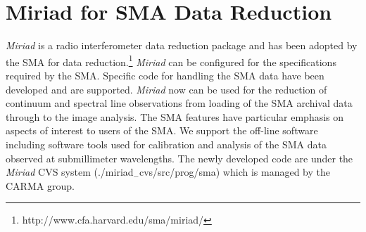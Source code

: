 \section{Miriad for SMA Data Reduction}
{\it {}Miriad} is a radio interferometer data reduction package \citep{stw95} and has been adopted by the SMA for data reduction.\footnote{http://www.cfa.harvard.edu/sma/miriad/} {\it {}Miriad} can be configured for the specifications required by the SMA. Specific code for handling the SMA data have been developed and are supported. {\it Miriad} now can be used for the reduction of continuum and spectral line observations from loading of the SMA archival data  through to the image analysis. The SMA features have particular emphasis on aspects of interest to users of the SMA. We support the off-line software including software tools used for calibration and analysis of the SMA data observed at submillimeter wavelengths. The newly developed code are under the {\it {}Miriad} CVS system (./miriad$_{-}$cvs/src/prog/sma) which is managed by the CARMA group.

